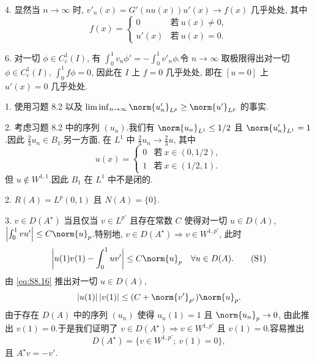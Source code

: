 
4. 显然当 $n\to\infty$ 时, $v'_n(x)=G'(nu(x))u'(x)\to f(x)$ 几乎处处, 其中
\begin{equation*}
f(x)=\begin{cases}
0 & \text{若}\ u(x)\ne0,\\
u'(x) & \text{若}\ u(x)=0.
\end{cases}
\end{equation*}

6. 对一切 $\phi\in C_c^1(I)$, 有 $\int_0^1v_n\phi'=-\int_0^1v'_n\phi$.令
$n\to\infty$ 取极限得出对一切 $\phi\in C_c^1(I)$, $\int_0^1f\phi=0$, 因此在
$I$ 上 $f=0$ 几乎处处, 即在 $[u=0]$ 上 $u'(x)=0$ 几乎处处.


1. 使用习题 8.2 以及 $\liminf_{n\to\infty}\norm{u'_n}_{L^p}\ge\norm{u'}_{L^p}$
的事实.

2. 考虑习题 8.2 中的序列 $(u_n)$.我们有 $\norm{u_n}_{L^1}\le1/2$ 且
$\norm{u'_n}_{L^1}=1$.因此 $\frac23u_n\in B_1$.另一方面, 在 $L^1$ 中
$\frac23u_n\to\frac23u$, 其中
\begin{equation*}
u(x)=\begin{cases}
0 & \text{若}\ x\in(0,1/2),\\
1 & \text{若}\ x\in(1/2,1).
\end{cases}
\end{equation*}
但 $u\notin W^{1,1}$.因此 $B_1$ 在 $L^1$ 中不是闭的.


2. $R(A)=L^p(0,1)$ 且 $N(A)=\{0\}$.

3. $v\in D(A^\star)$ 当且仅当 $v\in L^{p'}$ 且存在常数 $C$ 使得对一切
$u\in D(A)$, $\abs{\int_0^1vu'}\le C\norm{u}_p$.特别地,
$v\in D(A^\star)\Rightarrow v\in W^{1,p'}$, 此时
\begin{equation}
\abs{u(1)v(1)-\int_0^1uv'}\le C\norm{u}_p\quad\forall u\in D(A).
\tag{S1}
\label{eq:S8.16}
\end{equation}
由 \eqref{eq:S8.16} 推出对一切 $u\in D(A)$,
\begin{equation*}
\abs{u(1)}\abs{v(1)}\le(C+\norm{v'}_{p'})\norm{u}_p.
\end{equation*}
由于存在 $D(A)$ 中的序列 $(u_n)$ 使得 $u_n(1)=1$ 且 $\norm{u_n}_p\to0$,
由此推出 $v(1)=0$.于是我们证明了 $v\in D(A^\star)\Rightarrow v\in W^{1,p'}$
且 $v(1)=0$.容易推出
\begin{equation*}
D(A^\star)=\{v\in W^{1,p'};\ v(1)=0\},
\end{equation*}
且 $A^\star v=-v'$.

